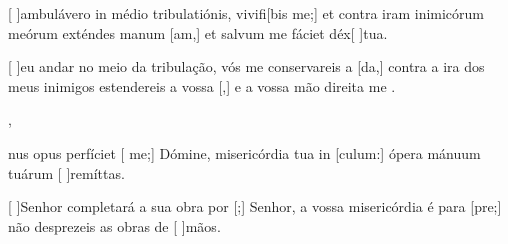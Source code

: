 {  %
  {\item {}[ ]{am}bulávero in médio tribulatiónis, vivifi[bis me;] et contra iram inimicórum meórum exténdes manum
      [am,] et salvum me fáciet déx[ ]{tu}a.}%
    {\item {}[ ]{eu} andar no meio da tribulação, vós me conservareis a [da,] contra a ira dos meus inimigos estendereis a vossa [,] e a vossa mão direita me .},
  {\item {}nus opus perfíciet [ me;] Dómine, misericórdia tua in [culum:] ópera mánuum tuárum
      [ ]{re}{mít}tas.}%
    {\item {}[ ]{Se}nhor completará a sua obra por [;] Senhor, a vossa misericórdia é para [pre;] não desprezeis as obras de [ ]{mãos}.}
}